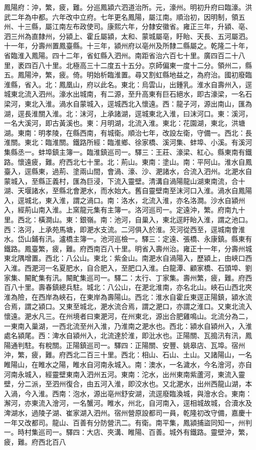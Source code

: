 \begin{pinyinscope}
鳳陽府：沖，繁，疲，難。分巡鳳潁六泗道治所。元，濠州。明初升府曰臨濠。洪武二年為中都。六年改中立府。七年更名鳳陽，屬江南。順治初，因明制，領五州、十三縣，屬江南左布政使司。康熙六年，分隸安徽省。雍正三年，升潁、亳、泗三州為直隸州，分潁上、霍丘屬潁，太和、蒙城屬亳，盱眙、天長、五河屬泗。十一年，分壽州置鳳臺縣。十三年，潁州府以亳州及所隸二縣屬之。乾隆二十年，省臨淮入鳳陽。四十二年，省虹縣入泗州。南距省治六百七十里。廣四百二十八里，袤四百八十里。北極高三十二度五十五分。京師偏東一度十二分。領州二，縣五。鳳陽沖，繁，疲。倚。明始析臨淮置。尋又割虹縣地益之，為府治。國初廢臨淮縣，省入。北：鳳凰山，府以此名。東北：烏雲山，出鍾乳。淮水自壽州入，逕城東北流入泗州。濠水出城南，有二源，至升高東有巨石絕水，即古濠梁，一名石梁河，東北入淮。渦水自蒙城入，逕城西北入懷遠。西：龍子河，源出南山，匯為湖，逕長淮關入淮。北：沫河，上承諸湖，逕城東北入淮，曰沫河口。東：溪河，一名大溪河，即古黃溪也。東：月明湖，北流入淮。東北：花園湖，東北，洪塘湖。東南：明孝陵，在縣西南，有城衛。順治七年，改設左衛，守備一。西北：長淮關。東北：臨淮關。鐵路所經：臨淮鄉、徐家橋、溪河集、蚌埠、小溪。有溪河集縣丞一。蚌埠鎮主簿一。臨淮鎮巡司一。驛三：王莊、濠梁、紅心。縣東南有鐵路。懷遠疲，難。府西北七十里。北：荊山。東南：塗山。南：平阿山。淮水自鳳臺入，逕縣東，過荊、塗兩山間，會渦、濠、沙、淝諸水，合流入泗州。北淝水自蒙城入，至縣正義村，匯為巨浸，下流入靈壁。清溝自渦陽龍山湖東南流，合十湖、天堰諸水，至縣北會淝水，而水始大。舊自靈壁南至沫河口入淮。渦水自鳳陽入，逕城北，東入淮，謂之渦口。南：洛水，北流入淮，亦名洛澗。沙水自潁州入，經荊山南入淮。上窯龍元集有主簿一。洛河巡司一。定遠沖，繁。府南九十里。西北：橫澗山。東：銀嶺。南：池河，自巢入，東北逕盱眙入淮，謂之池口。西：洛河，上承苑馬塘，即淝水支流。二河俱入於淮。芡河從西至，逕城南會淮水。岱山鋪有汛。瀘橋主簿一。池河巡檢一。驛三：定遠、張橋、永康鎮。縣東有鐵路。鳳臺繁，疲，難。府西南百八十里。明省入壽州治。雍正十一年，分壽州城東北隅增置。西北：八公山。東北：紫金山。南淝水自渦陽入，歷潁上，由峽口西入淮。西淝河一名夏肥水，自合肥入，至肥口入淮。白龍潭、顧家橋、石頭埠、劉家集、闞甿集有汛。闞甿集巡司一。驛二：太行、丁家集。壽州繁，疲，難。府西百八十里。壽春鎮總兵駐。城北：八公山，在淝北淮南，亦名北山。峽石山西北夾淮為險，在西岸為峽石，在東岸為壽陽山。西北：淮水自霍丘東逕正陽鎮，潁水流合焉，謂之潁口。又東至城北，淝水流合焉，謂之淝口，亦謂之淮口。又東北流入懷遠。淝水凡三。在州境者曰東淝河，在州東北，源出合肥雞鳴山。北流分為二，一東南入巢湖，一西北流至州入淮，乃淮南之淝水也。西北：潁水自潁州入，入淮處名潁尾。西：渒水自潁州入，北流達於淮，即沘水也。正陽關、瓦搗汛有汛，鳳陽通判駐。有稅關。正陽鎮巡司一。驛四：正陽關、安豐、姚皋店、瓦埠。宿州沖，繁，疲，難。府西北二百三十里。西北：相山、石山、土山。又諸陽山，一名睢陽山，在睢水之陽，睢水自河南永城入。南：澳水，一名濊水，今名澮河，亦自河南永城入，經靈壁東南入泗州五河。東南：沱水，出州東南紫蘆河，東流入靈壁，分二派，至泗州復合，由五河入淮，即洨水也。又北淝水，出州西龍山湖，本入渦，今入淮。西南：泡水，源出亳州舒安湖，流逕廢臨渙城，與澮水合。東南：澥河，亦東流入澮河，一名蟹河。睢水，州北，自河南入，逕相城故城，合瀆水及渒湖水，過陵子湖、崔家湖入泗州。宿州營原設都司一員，乾隆初改守備，嘉慶十一年又改都司。龍山、百善有分防營汛二。有衛。南平集，鳳潁捕盜同知一，州判一。時村集巡司一。驛四：大店、夾溝、睢陽、百善。城外有鐵路。靈壁沖，繁，疲，難。府西北百八
\end{pinyinscope}
